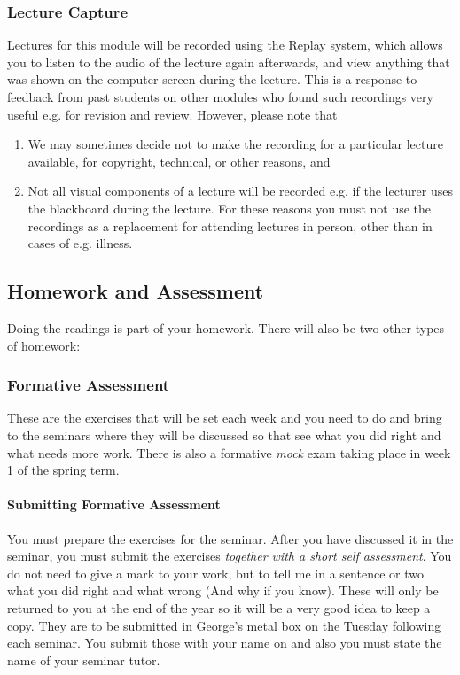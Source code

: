 \documentclass[12pt]{article}
\begin{document}
\subsubsection*{Lecture Capture}
Lectures for this module will be recorded using the Replay system, which allows you to listen to the audio of the lecture again afterwards, and view anything that was shown on the computer screen during the lecture. This is a response to feedback from past students on other modules who found such recordings very useful e.g. for revision and review.
However, please note that
\begin{enumerate}[i]
\item We may sometimes decide not to make the recording for a particular lecture available, for copyright, technical, or other  reasons, and
\item Not all visual components of a lecture will be recorded e.g. if the lecturer uses the blackboard during the lecture. For these reasons you must not use the recordings as a replacement for attending lectures in person, other than in cases of e.g. illness.
\end{enumerate}

\subsection{Homework and Assessment} Doing the readings is part of your homework.  There will also be two other types of homework:
\subsubsection*{Formative Assessment} These are the exercises that will be set each week and you need to do and bring to the seminars where they will be discussed so that see what you did right and what needs more work.  
There is also a formative \textit{mock} exam taking place in week 1 of the spring term.
\paragraph{Submitting Formative Assessment} You must prepare the exercises for the seminar.  After you have discussed it in the seminar, you must submit the exercises \textit{together with a short self assessment}.  You do not need to give a mark to your work, but to tell me in a sentence or two what you did right and what wrong (And why if you know).  These will only be returned to you at the end of the year so it will be a very good idea to keep a copy.  They are to be submitted in George's metal box on the Tuesday following each seminar.  You submit those with your name on and also you must state the name of your seminar tutor.
\end{document}
